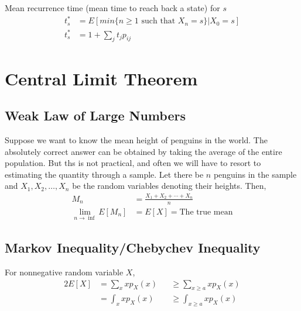\documentclass[11pt, a4paper]{article}
\begin{document}
    Mean recurrence time (mean time to reach back a state) for $s$
    \begin{align*}
        t_{s}^{*} &= E[min\{n \geq 1 \text{ such that } X_{n}=s\} | X_{0} = s] \\
        t_{s}^{*} &= 1 + \sum_{j} t_{j} p_{ij}
    \end{align*}

    \section{Central Limit Theorem}
    \subsection{Weak Law of Large Numbers}
    Suppose we want to know the mean height of penguins in the world. The absolutely correct answer can be obtained by taking the average of the entire population. But ths is not practical, and often we will have to resort to estimating the quantity through a sample. Let there be $n$ penguins in the sample and $X_{1}, X_{2}, \ldots, X_{n}$ be the random variables denoting their heights. Then,
    \begin{align*}
        M_{n} &= \frac{X_{1} + X_{2} + \cdots + X_{n}}{n}\\
        \lim_{n \to \inf} E[M_{n}] &= E[X] = \text{The true mean}
    \end{align*}

    \subsection{Markov Inequality/Chebychev Inequality}
    For nonnegative random variable $X$,
    \begin{alignat*}{2}
        E[X] &= \sum_{x}xp_{X}(x) &&\geq \sum_{x \geq a}xp_{X}(x) \tag*{discrete case}\\
            &= \int_{x}xp_{X}(x) &&\geq \int_{x \geq a}xp_{X}(x) \tag*{continuous case}
    \end{alignat*}
    
\end{document}
